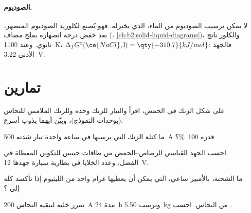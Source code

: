 \paragraph{الصوديوم.} لا يمكن ترسيب الصوديوم من الماء، الذي يختزله.
فهو يُصنع  لكلوريد الصوديوم المنصهر، بعد خفض درجة انصهاره
بملح مضاف (، \cref{ch:b2:solid-liquid-diagrams})،
والكلور ناتج ثانوي. وعند \qty{1100}{K}، $\Delta_f G^\circ(\ce{NaCl}, \text{l}) =
\qty{-310.7}{kJ/mol}$: فالجهد الأدنى \qty{3.22}{V}.

\section{تمارين}

\begin{exercise}[$\star$]\label{exo:b2:batteries-electrolysis:1}
على شكل الزنك في الحمض، اقرأ  والتيار للزنك
وحده وللزنك الملامس للنحاس (بوحدات النموذج)، وبيّن أيهما يذوب
أسرع.
\end{exercise}

\begin{exercise}[$\star$]\label{exo:b2:batteries-electrolysis:2}
ما كتلة الزنك التي يرسبها في ساعة واحدة تيار شدته \qty{500}{A}  قدره 100~\%؟
\end{exercise}

\begin{exercise}[$\star$]\label{exo:b2:batteries-electrolysis:3}
احسب الجهد القياسي  الرصاص--الحمض من طاقات جيبس
للتكوين المعطاة في الفصل، وعدد الخلايا في بطارية سيارة
جهدها \qty{12}{V}.
\end{exercise}

\begin{exercise}[$\star$]\label{exo:b2:batteries-electrolysis:4}
ما الشحنة، بالأمبير ساعي، التي يمكن أن يعطيها غرام واحد من الليثيوم إذا تأكسد
كله إلى ؟
\end{exercise}

\begin{exercise}[$\star\star$]\label{exo:b2:batteries-electrolysis:5}
تمرر خلية لتنقية النحاس \qty{200}{A} مدة \qty{24}{h} وترسب
\qty{5.50}{kg} من النحاس. احسب .
\end{exercise}

